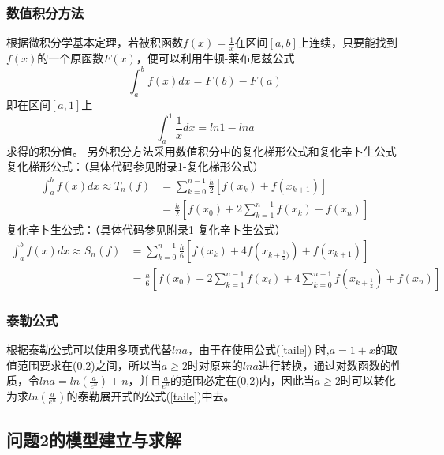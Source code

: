 \documentclass[UTF8]{ctexart}
\begin{document}
			\subsubsection{数值积分方法} %
	根据微积分学基本定理，若被积函数$f(x)=\frac{1}{x}$在区间$[a,b]$上连续，只要能找到$f(x)$的一个原函数$F(x)$，便可以利用牛顿-莱布尼兹公式
	$$\int_{a}^{b}f(x)dx=F(b)-F(a)$$
	即在区间$[a,1]$上 
	$$\int_{a}^{1}\frac{1}{x}dx=ln1-lna$$
	求得的积分值。
	另外积分方法采用数值积分中的复化梯形公式和复化辛卜生公式
	复化梯形公式：（具体代码参见附录1-复化梯形公式）
	\begin{equation}
		\begin{split}
		\int_{a}^{b}f(x)dx \approx T_n(f)& = \sum_{k=0}^{n-1}\frac{h}{2}[f(x_k)+f(x_{k+1})]\\
		&=\frac{h}{2}[f(x_0)+2\sum_{k=1}^{n-1}f(x_k)+f(x_n)]
		\end{split}
	\end{equation}
	复化辛卜生公式：（具体代码参见附录1-复化辛卜生公式）
	\begin{equation}
		\begin{split}
		\int_{a}^{b}f(x)dx \approx S_n(f)& = \sum_{k=0}^{n-1}\frac{h}{6}[f(x_k)+4f(x_{k+\frac{1}{2})})+f(x_{k+1})]\\
		&=\frac{h}{6}[f(x_0)+2\sum_{k=1}^{n-1}f(x_i)+4\sum_{k=0}^{n-1}f(x_{k+{\frac{1}{2}}}) +f(x_n)]
		\end{split}
	\end{equation}
			\subsubsection{泰勒公式} %
	根据泰勒公式可以使用多项式代替$lna$，由于在使用公式(\ref{taile})
	时,$a=1+x$的取值范围要求在(0,2)之间，所以当$a \geq 2$时对原来的$lna$进行转换，通过对数函数的性质，令$lna=ln(\frac{a}{e^n})+n$，并且$\frac{a}{e^n}$的范围必定在(0,2)内，因此当$a \geq 2$时可以转化为求$ln(\frac{a}{e^n})$的泰勒展开式的公式(\ref{taile})中去。
	\subsection{问题2的模型建立与求解}%
\end{document}
